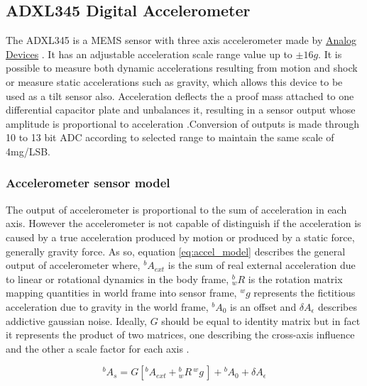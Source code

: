 \subsection{ADXL345 Digital Accelerometer} \label{subsection:adxl345}


The ADXL345 is a \gls{MEMS} sensor with three axis accelerometer made by
\href{http://http://www.analog.com/en/index.html}{Analog Devices} . It has an
adjustable acceleration scale range value up to $\pm16g$. It is possible to
measure both dynamic accelerations resulting from motion and shock or measure
static accelerations such as gravity, which allows this device to be used as a
tilt sensor also. Acceleration deflects the a proof mass attached to one differential capacitor plate and unbalances it, resulting in a sensor output whose amplitude is
proportional to acceleration \cite{adxl345_datasheet}.Conversion of outputs is made through 10 to 13 bit \gls{ADC} according to selected
range to maintain the same scale of 4mg/LSB. 


\subsubsection{Accelerometer sensor model}\label{subsubsection:adxl345model}

The output of accelerometer is proportional to the sum of acceleration in each
axis. However the accelerometer is not capable of distinguish if the
acceleration is caused by a true acceleration produced by motion or produced by
a static force, generally gravity force. As so, equation \eqref{eq:accel_model}
describes the general output of accelerometer \cite{Vectornav_calibration}
where, ${}^bA_{ext}$ is the sum of real external acceleration due to
linear or rotational dynamics in the body frame, ${}^b_wR$ is the rotation
matrix mapping quantities in world frame into sensor frame, ${}^wg $
represents the fictitious acceleration due to gravity in the world frame, ${}^bA_{0}$ is an offset and
$\delta A_{\epsilon}$ describes addictive gaussian noise.
Ideally, $G$ should be equal to identity matrix but in fact it represents the
product of two matrices, one describing the cross-axis influence and the other
a scale factor for each axis \cite{Vectornav_calibration}.

\begin{equation}
{}^bA_{s}=G[{}^bA_{ext} + {}^b_wR\,{}^wg\,] + {}^bA_{0} + \delta A_{\epsilon}
\label{eq:accel_model}
\end{equation}

